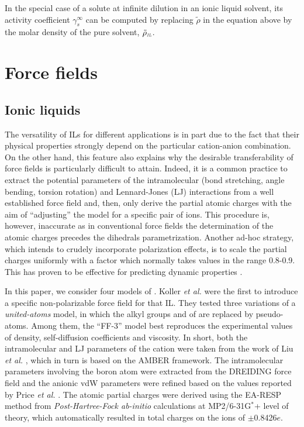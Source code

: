 \documentclass[3p,twocolumn]{elsarticle}
\begin{document}
In the special case of a solute at infinite dilution in an ionic liquid solvent, its activity coefficient $\gamma^\infty_s$ can be computed by replacing $\tilde{\rho}$ in the equation above by the molar density of the pure solvent, $\tilde{\rho}_\textit{\tiny IL}$.

\section{Force fields}
\label{sec:force_field}

\subsection{Ionic liquids}
\label{sec:force_field_il}

The versatility of ILs for different applications is in part due to the fact that their physical properties strongly depend on the particular cation-anion combination.
On the other hand, this feature also explains why the desirable transferability of force fields is particularly difficult to attain.
Indeed, it is a common practice to extract the potential parameters of the intramolecular (bond stretching, angle bending, torsion rotation) and Lennard-Jones (LJ) interactions from a well established force field and, then, only derive the partial atomic charges with the aim of ``adjusting'' the model for a specific pair of ions.
This procedure is, however, inaccurate as in conventional force fields the determination of the atomic charges precedes the dihedrals parametrization.
Another ad-hoc strategy, which intends to crudely incorporate polarization effects, is to scale the partial charges uniformly with a factor which normally takes values in the range 0.8-0.9.
This has proven to be effective for predicting dynamic properties \cite{Schr_der_2012}.

In this paper, we consider four models of \ce{[emim][B(CN)_4]}.
Koller \textit{et al.} \cite{Koller_2012} were the first to introduce a specific non-polarizable force field for that IL.
They tested three variations of a \textit{united-atoms} model, in which the alkyl groups  and  of \ce{[emim]^+} are replaced by pseudo-atoms.
Among them, the ``FF-3'' model best reproduces the experimental values of density, self-diffusion coefficients and viscosity.
In short, both the intramolecular and LJ parameters of the cation were taken from the work of Liu \textit{et al.} \cite{Liu_2006}, which in turn is based on the AMBER \cite{Cornell_1995} framework.
The intramolecular parameters involving the boron atom were extracted from the DREIDING \cite{Mayo_1990} force field and the anionic vdW parameters were refined based on the values reported by Price \textit{et al.} \cite{Price_2001}.
The atomic partial charges were derived using the EA-RESP method \cite{Basma_2001} from \textit{Post-Hartree-Fock ab-initio} calculations at MP2/6-31G$^\ast$+ level of theory, which automatically resulted in total charges on the ions of $\pm$0.8426$e$. 
\end{document}
